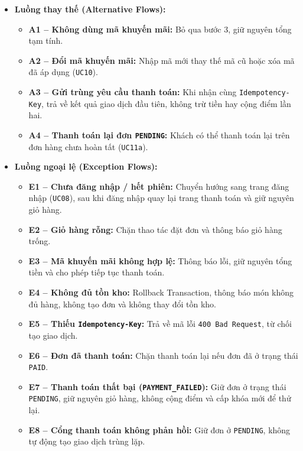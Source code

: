 \begin{itemize}
\begin{enumerate}
        \item Hệ thống xóa giỏ hàng và hiển thị màn hình xác nhận đơn hàng (\texttt{UC13}).
        \item Khách hàng theo dõi trạng thái xử lý đơn hàng (\texttt{UC17}).
    \end{enumerate}
    \item \textbf{Luồng thay thế (Alternative Flows):}
    \begin{itemize}
        \item \textbf{A1 -- Không dùng mã khuyến mãi:} Bỏ qua bước 3, giữ nguyên tổng tạm tính.
        \item \textbf{A2 -- Đổi mã khuyến mãi:} Nhập mã mới thay thế mã cũ hoặc xóa mã đã áp dụng (\texttt{UC10}).
        \item \textbf{A3 -- Gửi trùng yêu cầu thanh toán:} Khi nhận cùng \texttt{Idempotency-Key}, trả về kết quả giao dịch đầu tiên, không trừ tiền hay cộng điểm lần hai.
        \item \textbf{A4 -- Thanh toán lại đơn \texttt{PENDING}:} Khách có thể thanh toán lại trên đơn hàng chưa hoàn tất (\texttt{UC11a}).
    \end{itemize}
    \item \textbf{Luồng ngoại lệ (Exception Flows):}
    \begin{itemize}
        \item \textbf{E1 -- Chưa đăng nhập / hết phiên:} Chuyển hướng sang trang đăng nhập (\texttt{UC08}), sau khi đăng nhập quay lại trang thanh toán và giữ nguyên giỏ hàng.
        \item \textbf{E2 -- Giỏ hàng rỗng:} Chặn thao tác đặt đơn và thông báo giỏ hàng trống.
        \item \textbf{E3 -- Mã khuyến mãi không hợp lệ:} Thông báo lỗi, giữ nguyên tổng tiền và cho phép tiếp tục thanh toán.
        \item \textbf{E4 -- Không đủ tồn kho:} Rollback Transaction, thông báo món không đủ hàng, không tạo đơn và không thay đổi tồn kho.
        \item \textbf{E5 -- Thiếu \texttt{Idempotency-Key}:} Trả về mã lỗi \texttt{400 Bad Request}, từ chối tạo giao dịch.
        \item \textbf{E6 -- Đơn đã thanh toán:} Chặn thanh toán lại nếu đơn đã ở trạng thái \texttt{PAID}.
        \item \textbf{E7 -- Thanh toán thất bại (\texttt{PAYMENT\_FAILED}):} Giữ đơn ở trạng thái \texttt{PENDING}, giữ nguyên giỏ hàng, không cộng điểm và cấp khóa mới để thử lại.
        \item \textbf{E8 -- Cổng thanh toán không phản hồi:} Giữ đơn ở \texttt{PENDING}, không tự động tạo giao dịch trùng lặp.
    \end{itemize}
\end{itemize}